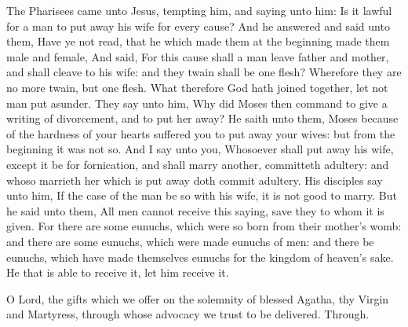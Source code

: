 
\tractnotice


 The Pharisees came unto Jesus, tempting him, and saying unto him: Is it lawful for a man to put away his wife for every cause? And he answered and said unto them, Have ye not read, that he which made them at the beginning made them male and female, And said, For this cause shall a man leave father and mother, and shall cleave to his wife: and they twain shall be one flesh? Wherefore they are no more twain, but one flesh. What therefore God hath joined together, let not man put asunder. They say unto him, Why did Moses then command to give a writing of divorcement, and to put her away? He saith unto them, Moses because of the hardness of your hearts suffered you to put away your wives: but from the beginning it was not so. And I say unto you, Whosoever shall put away his wife, except it be for fornication, and shall marry another, committeth adultery: and whoso marrieth her which is put away doth commit adultery. His disciples say unto him, If the case of the man be so with his wife, it is not good to marry. But he said unto them, All men cannot receive this saying, save they to whom it is given. For there are some eunuchs, which were so born from their mother's womb: and there are some eunuchs, which were made eunuchs of men: and there be eunuchs, which have made themselves eunuchs for the kingdom of heaven's sake. He that is able to receive it, let him receive it.


\secret
{} O Lord, the gifts which we offer on the solemnity of blessed Agatha, thy Virgin and Martyress, through whose advocacy we trust to be delivered. Through.


